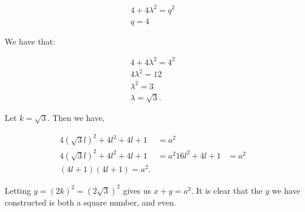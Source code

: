\documentclass{article}
\begin{document}
\begin{align*}
4 + 4\lambda^2 = q^2 \\
q = 4
\end{align*}

We have that:

\begin{align*}
4 + 4\lambda^2 = 4^2 \\
4\lambda^2 = 12 \\
\lambda^2 = 3 \\
\lambda = \sqrt{3}.
\end{align*}

Let $k = \sqrt{3}$. Then we have,

\begin{align*}
4(\sqrt{3}l)^2 + 4l^2 + 4l + 1 &= a^2 \\
4(\sqrt{3}l)^2 + 4l^2 + 4l + 1 &= a^2
16l^2 + 4l + 1 &= a^2 \\
(4l + 1)(4l + 1) = a^2.
\end{align*}

Letting $y = (2k)^2 = (2\sqrt{3})^2$ gives us $x + y = a^2$. It is clear that the $y$ we have constructed is both a square number, and even.
\end{document}

